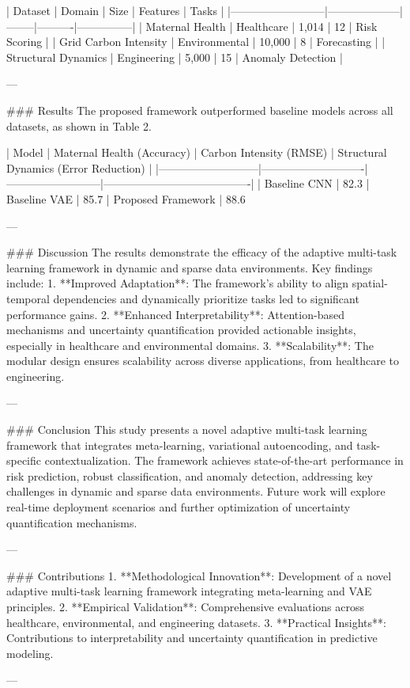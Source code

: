 | Dataset                  | Domain             | Size   | Features | Tasks         |
|--------------------------|--------------------|--------|----------|---------------|
| Maternal Health          | Healthcare         | 1,014  | 12       | Risk Scoring  |
| Grid Carbon Intensity    | Environmental      | 10,000 | 8        | Forecasting   |
| Structural Dynamics      | Engineering        | 5,000  | 15       | Anomaly Detection |

---

### Results
The proposed framework outperformed baseline models across all datasets, as shown in Table 2.

| Model                     | Maternal Health (Accuracy) | Carbon Intensity (RMSE) | Structural Dynamics (Error Reduction) |
|---------------------------|----------------------------|--------------------------|----------------------------------------|
| Baseline CNN              | 82.3%
| Baseline VAE              | 85.7%
| Proposed Framework        | 88.6%

---

### Discussion
The results demonstrate the efficacy of the adaptive multi-task learning framework in dynamic and sparse data environments. Key findings include:
1. **Improved Adaptation**: The framework's ability to align spatial-temporal dependencies and dynamically prioritize tasks led to significant performance gains.
2. **Enhanced Interpretability**: Attention-based mechanisms and uncertainty quantification provided actionable insights, especially in healthcare and environmental domains.
3. **Scalability**: The modular design ensures scalability across diverse applications, from healthcare to engineering.

---

### Conclusion
This study presents a novel adaptive multi-task learning framework that integrates meta-learning, variational autoencoding, and task-specific contextualization. The framework achieves state-of-the-art performance in risk prediction, robust classification, and anomaly detection, addressing key challenges in dynamic and sparse data environments. Future work will explore real-time deployment scenarios and further optimization of uncertainty quantification mechanisms.

---

### Contributions
1. **Methodological Innovation**: Development of a novel adaptive multi-task learning framework integrating meta-learning and VAE principles.
2. **Empirical Validation**: Comprehensive evaluations across healthcare, environmental, and engineering datasets.
3. **Practical Insights**: Contributions to interpretability and uncertainty quantification in predictive modeling.

---